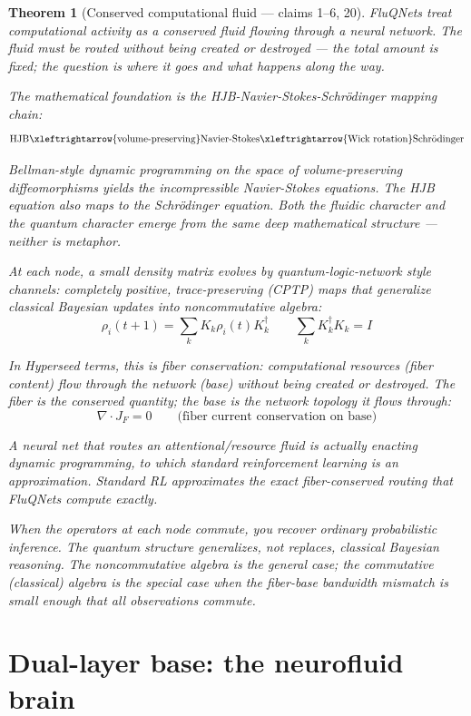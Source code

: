 \documentclass[11pt,a4paper]{article}
\newtheorem{theorem}[definition]{Theorem}
\begin{document}
\begin{theorem}[Conserved computational fluid --- claims 1--6, 20]
\label{thm:fluqnets}
FluQNets treat computational activity as a conserved fluid flowing through
a neural network. The fluid must be routed without being created or
destroyed --- the total amount is fixed; the question is where it goes
and what happens along the way.

The mathematical foundation is the HJB-Navier-Stokes-Schr\"odinger
mapping chain:
\[
  \text{HJB} \xleftrightarrow{\text{volume-preserving}}
  \text{Navier-Stokes} \xleftrightarrow{\text{Wick rotation}}
  \text{Schr\"odinger}
\]

Bellman-style dynamic programming on the space of volume-preserving
diffeomorphisms yields the incompressible Navier-Stokes equations.
The HJB equation also maps to the Schr\"odinger equation. Both the
fluidic character and the quantum character emerge from the same deep
mathematical structure --- neither is metaphor.

At each node, a small density matrix evolves by quantum-logic-network
style channels: completely positive, trace-preserving (CPTP) maps that
generalize classical Bayesian updates into noncommutative algebra:
\[
  \rho_i(t+1) = \sum_k K_k \rho_i(t) K_k^\dagger \qquad
  \sum_k K_k^\dagger K_k = I
\]

In Hyperseed terms, this is \emph{fiber conservation}: computational
resources (fiber content) flow through the network (base) without being
created or destroyed. The fiber is the conserved quantity; the base is
the network topology it flows through:
\[
  \nabla \cdot J_F = 0 \qquad \text{(fiber current conservation on base)}
\]

A neural net that routes an attentional/resource fluid is actually
enacting dynamic programming, to which standard reinforcement learning
is an approximation. Standard RL approximates the exact fiber-conserved
routing that FluQNets compute exactly.

When the operators at each node commute, you recover ordinary
probabilistic inference. The quantum structure generalizes, not replaces,
classical Bayesian reasoning. The noncommutative algebra is the general
case; the commutative (classical) algebra is the special case when the
fiber-base bandwidth mismatch is small enough that all observations
commute.
\end{theorem}

\section{Dual-layer base: the neurofluid brain}
\label{sec:brain}
\end{document}
